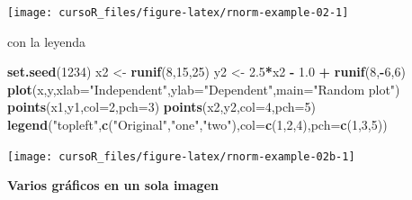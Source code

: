 \documentclass[]{book}
\newenvironment{Shaded}{\begin{snugshade}}{\end{snugshade}}
\newcommand{\KeywordTok}[1]{\textcolor[rgb]{0.13,0.29,0.53}{\textbf{#1}}}
\newcommand{\DataTypeTok}[1]{\textcolor[rgb]{0.13,0.29,0.53}{#1}}
\newcommand{\DecValTok}[1]{\textcolor[rgb]{0.00,0.00,0.81}{#1}}
\newcommand{\FloatTok}[1]{\textcolor[rgb]{0.00,0.00,0.81}{#1}}
\newcommand{\StringTok}[1]{\textcolor[rgb]{0.31,0.60,0.02}{#1}}
\newcommand{\OperatorTok}[1]{\textcolor[rgb]{0.81,0.36,0.00}{\textbf{#1}}}
\newcommand{\NormalTok}[1]{#1}
\begin{document}
\begin{center}\texttt{[image: cursoR\_files/figure-latex/rnorm-example-02-1]} \end{center}

con la leyenda

\begin{Shaded}
\begin{Highlighting}[]
\KeywordTok{set.seed}\NormalTok{(}\DecValTok{1234}\NormalTok{)}
\NormalTok{x2 <-}\StringTok{ }\KeywordTok{runif}\NormalTok{(}\DecValTok{8}\NormalTok{,}\DecValTok{15}\NormalTok{,}\DecValTok{25}\NormalTok{)}
\NormalTok{y2 <-}\StringTok{ }\FloatTok{2.5}\OperatorTok{*}\NormalTok{x2 }\OperatorTok{-}\StringTok{ }\FloatTok{1.0} \OperatorTok{+}\StringTok{ }\KeywordTok{runif}\NormalTok{(}\DecValTok{8}\NormalTok{,}\OperatorTok{-}\DecValTok{6}\NormalTok{,}\DecValTok{6}\NormalTok{)}
 \KeywordTok{plot}\NormalTok{(x,y,}\DataTypeTok{xlab=}\StringTok{"Independent"}\NormalTok{,}\DataTypeTok{ylab=}\StringTok{"Dependent"}\NormalTok{,}\DataTypeTok{main=}\StringTok{"Random plot"}\NormalTok{)}
 \KeywordTok{points}\NormalTok{(x1,y1,}\DataTypeTok{col=}\DecValTok{2}\NormalTok{,}\DataTypeTok{pch=}\DecValTok{3}\NormalTok{)}
 \KeywordTok{points}\NormalTok{(x2,y2,}\DataTypeTok{col=}\DecValTok{4}\NormalTok{,}\DataTypeTok{pch=}\DecValTok{5}\NormalTok{)}
 \KeywordTok{legend}\NormalTok{(}\StringTok{"topleft"}\NormalTok{,}\KeywordTok{c}\NormalTok{(}\StringTok{"Original"}\NormalTok{,}\StringTok{"one"}\NormalTok{,}\StringTok{"two"}\NormalTok{),}\DataTypeTok{col=}\KeywordTok{c}\NormalTok{(}\DecValTok{1}\NormalTok{,}\DecValTok{2}\NormalTok{,}\DecValTok{4}\NormalTok{),}\DataTypeTok{pch=}\KeywordTok{c}\NormalTok{(}\DecValTok{1}\NormalTok{,}\DecValTok{3}\NormalTok{,}\DecValTok{5}\NormalTok{))}
\end{Highlighting}
\end{Shaded}

\begin{center}\texttt{[image: cursoR\_files/figure-latex/rnorm-example-02b-1]} \end{center}

\textbf{Varios gráficos en un sola imagen}
\end{document}
